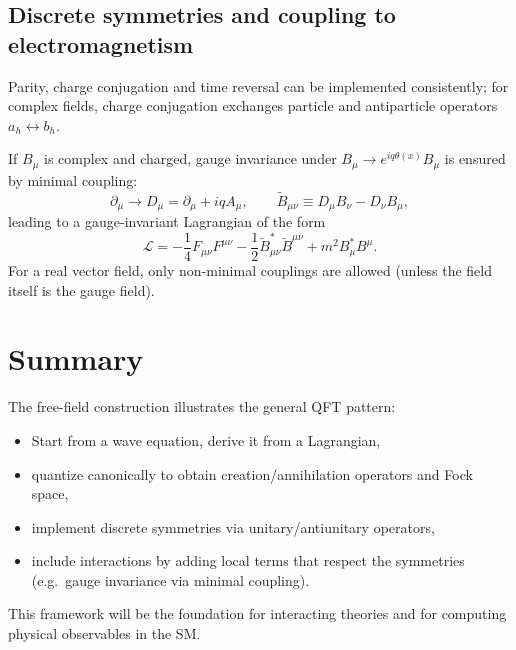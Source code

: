 \subsection{Discrete symmetries and coupling to electromagnetism}
Parity, charge conjugation and time reversal can be implemented consistently; for complex fields,
charge conjugation exchanges particle and antiparticle operators $a_h\leftrightarrow b_h$.

If $B_\mu$ is complex and charged, gauge invariance under $B_\mu\to e^{iq\theta(x)}B_\mu$ is ensured by minimal coupling:
\begin{equation}
\partial_\mu \to D_\mu=\partial_\mu+i q A_\mu,\qquad
\tilde B_{\mu\nu}\equiv D_\mu B_\nu - D_\nu B_\mu,
\end{equation}
leading to a gauge-invariant Lagrangian of the form
\begin{equation}
\mathcal L = -\frac14 F_{\mu\nu}F^{\mu\nu} -\frac12 \tilde B_{\mu\nu}^\ast \tilde B^{\mu\nu} + m^2 B_\mu^\ast B^\mu.
\end{equation}
For a real vector field, only non-minimal couplings are allowed (unless the field itself is the gauge field).

\section{Summary}
The free-field construction illustrates the general QFT pattern:
\begin{itemize}
  \item Start from a wave equation, derive it from a Lagrangian,
  \item quantize canonically to obtain creation/annihilation operators and Fock space,
  \item implement discrete symmetries via unitary/antiunitary operators,
  \item include interactions by adding local terms that respect the symmetries (e.g.\ gauge invariance via minimal coupling).
\end{itemize}
This framework will be the foundation for interacting theories and for computing physical observables in the SM.
